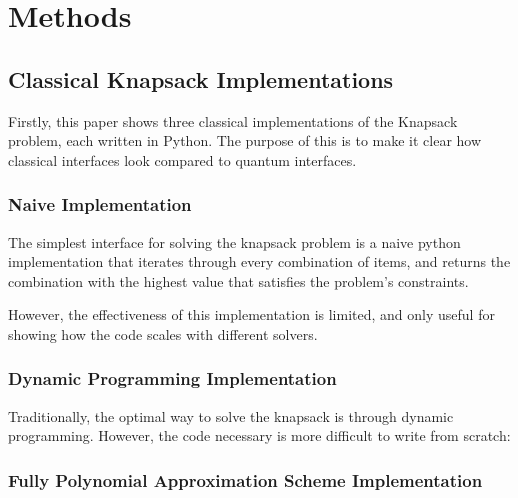 \documentclass{article}
\begin{document}
\section{Methods}

\subsection{Classical Knapsack Implementations}

Firstly, this paper shows three classical implementations of the Knapsack problem, each written in Python.
The purpose of this is to make it clear how classical interfaces look compared to quantum interfaces.

\subsubsection{Naive Implementation}

The simplest interface for solving the knapsack problem is a naive python implementation that iterates through every combination of items, and returns the combination with the highest value that satisfies the problem's constraints.
\lstset{language=Python}

However, the effectiveness of this implementation is limited, and only useful for showing how the code scales with different solvers.
\newpage

\subsubsection{Dynamic Programming Implementation}

Traditionally, the optimal way to solve the knapsack is through dynamic programming.
However, the code necessary is more difficult to write from scratch:

\lstset{language=Python}

\newpage

\subsubsection{Fully Polynomial Approximation Scheme Implementation}
\end{document}
